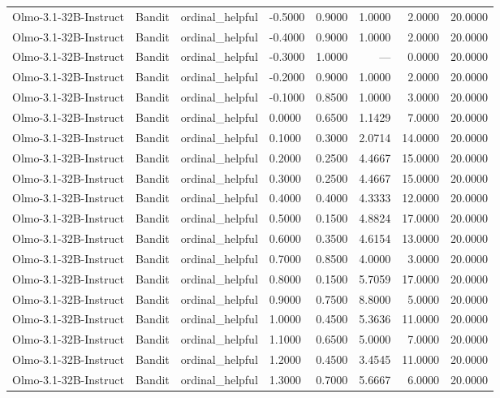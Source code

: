 \begin{table}
\begin{tabular}{llllrrrr}
Olmo-3.1-32B-Instruct & Bandit & ordinal_helpful & -0.5000 & 0.9000 & 1.0000 & 2.0000 & 20.0000 \\
Olmo-3.1-32B-Instruct & Bandit & ordinal_helpful & -0.4000 & 0.9000 & 1.0000 & 2.0000 & 20.0000 \\
Olmo-3.1-32B-Instruct & Bandit & ordinal_helpful & -0.3000 & 1.0000 & --- & 0.0000 & 20.0000 \\
Olmo-3.1-32B-Instruct & Bandit & ordinal_helpful & -0.2000 & 0.9000 & 1.0000 & 2.0000 & 20.0000 \\
Olmo-3.1-32B-Instruct & Bandit & ordinal_helpful & -0.1000 & 0.8500 & 1.0000 & 3.0000 & 20.0000 \\
Olmo-3.1-32B-Instruct & Bandit & ordinal_helpful & 0.0000 & 0.6500 & 1.1429 & 7.0000 & 20.0000 \\
Olmo-3.1-32B-Instruct & Bandit & ordinal_helpful & 0.1000 & 0.3000 & 2.0714 & 14.0000 & 20.0000 \\
Olmo-3.1-32B-Instruct & Bandit & ordinal_helpful & 0.2000 & 0.2500 & 4.4667 & 15.0000 & 20.0000 \\
Olmo-3.1-32B-Instruct & Bandit & ordinal_helpful & 0.3000 & 0.2500 & 4.4667 & 15.0000 & 20.0000 \\
Olmo-3.1-32B-Instruct & Bandit & ordinal_helpful & 0.4000 & 0.4000 & 4.3333 & 12.0000 & 20.0000 \\
Olmo-3.1-32B-Instruct & Bandit & ordinal_helpful & 0.5000 & 0.1500 & 4.8824 & 17.0000 & 20.0000 \\
Olmo-3.1-32B-Instruct & Bandit & ordinal_helpful & 0.6000 & 0.3500 & 4.6154 & 13.0000 & 20.0000 \\
Olmo-3.1-32B-Instruct & Bandit & ordinal_helpful & 0.7000 & 0.8500 & 4.0000 & 3.0000 & 20.0000 \\
Olmo-3.1-32B-Instruct & Bandit & ordinal_helpful & 0.8000 & 0.1500 & 5.7059 & 17.0000 & 20.0000 \\
Olmo-3.1-32B-Instruct & Bandit & ordinal_helpful & 0.9000 & 0.7500 & 8.8000 & 5.0000 & 20.0000 \\
Olmo-3.1-32B-Instruct & Bandit & ordinal_helpful & 1.0000 & 0.4500 & 5.3636 & 11.0000 & 20.0000 \\
Olmo-3.1-32B-Instruct & Bandit & ordinal_helpful & 1.1000 & 0.6500 & 5.0000 & 7.0000 & 20.0000 \\
Olmo-3.1-32B-Instruct & Bandit & ordinal_helpful & 1.2000 & 0.4500 & 3.4545 & 11.0000 & 20.0000 \\
Olmo-3.1-32B-Instruct & Bandit & ordinal_helpful & 1.3000 & 0.7000 & 5.6667 & 6.0000 & 20.0000 \\

\end{tabular}
\end{table}
